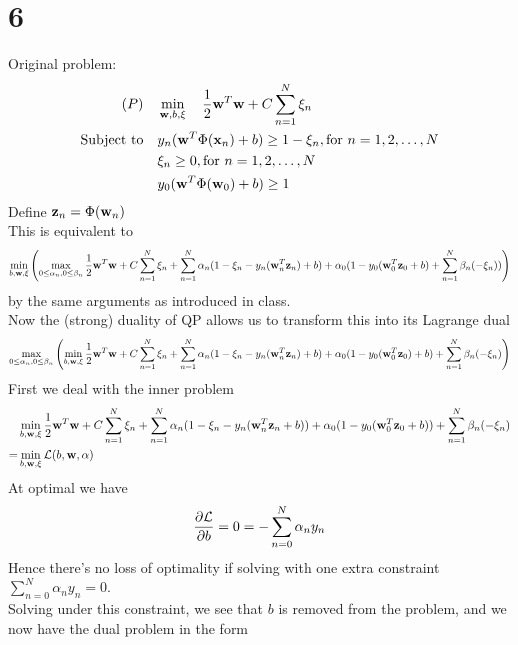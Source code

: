 \documentclass[11pt]{article}
\theoremstyle{definition}
\begin{document}
\section*{6}
Original problem:
\begin{align*}
  (P)\quad &\min_{\vb{w}, b, \xi} \quad \frac{1}{2}\vb{w}^T\vb{w} + C\sum^N_{n = 1}\xi_n \\ 
  \text{Subject to}\quad& y_n(\vb{w}^T\Phi(\vb{x}_n) + b)\geq 1 - \xi_n, \text{for }n = 1, 2,\dots,N \\ 
  &\xi_n \geq 0, \text{for }n = 1, 2, \dots, N \\ 
  & y_0(\vb{w}^T\Phi(\vb{w}_0) + b) \geq 1
\end{align*}
Define $\vb{z}_n = \Phi(\vb{w}_n)$ \\
This is equivalent to 
\begin{align*}
  \min_{b, \vb{w}, \xi}\left(\max_{0\leq \alpha_n, 0\leq \beta_n}\frac{1}{2}\vb{w}^T\vb{w} + C\sum^N_{n = 1}\xi_n + \sum^N_{n = 1}\alpha_n(1 - \xi_n - y_n(\vb{w}_n^T\vb{z}_n) + b) + \alpha_0(1 - y_0(\vb{w}_0^T\vb{z}_0 + b) + \sum^N_{n = 1}\beta_n(-\xi_n))\right)
\end{align*}
by the same arguments as introduced in class. \\ 
Now the (strong) duality of QP allows us to transform this into its Lagrange dual 
\begin{align*}
  \max_{0\leq \alpha_n, 0\leq \beta_n}\left(\min_{b, \vb{w}, \xi}\frac{1}{2}\vb{w}^T\vb{w} + C\sum^N_{n = 1}\xi_n + \sum^N_{n = 1}\alpha_n(1 - \xi_n - y_n(\vb{w}_n^T\vb{z}_n) + b) + \alpha_0(1 - y_0(\vb{w}_0^T\vb{z}_0) + b) + \sum^N_{n = 1}\beta_n(-\xi_n)\right)
\end{align*}
First we deal with the inner problem 
\begin{align*}
  &\min_{b, \vb{w}, \xi}\frac{1}{2}\vb{w}^T\vb{w} + C\sum^N_{n = 1}\xi_n + \sum^N_{n = 1}\alpha_n(1 - \xi_n - y_n(\vb{w}_n^T\vb{z}_n + b)) + \alpha_0(1 - y_0(\vb{w}_0^T\vb{z}_0 + b)) + \sum^N_{n = 1}\beta_n(-\xi_n)\\ 
  = &\min_{b, \vb{w}, \xi}\mathcal{L}(b, \vb{w}, \alpha)
\end{align*}
At optimal we have
\begin{align*}
  \pdv{\mathcal{L}}{b} = 0 = -\sum^N_{n = 0}\alpha_ny_n
\end{align*}
Hence there's no loss of optimality if solving with one extra constraint $\sum^N_{n = 0}\alpha_ny_n = 0$. \\ 
Solving under this constraint, we see that $b$ is removed from the problem, and we now have the dual problem in the form 
\end{document}
